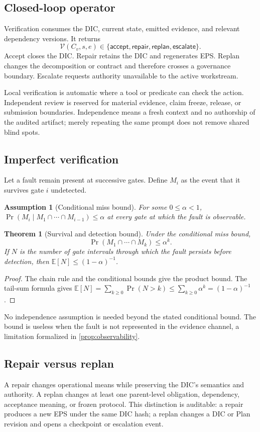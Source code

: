\documentclass[11pt]{article}
\newtheorem{assumption}[definition]{Assumption}
\newtheorem{theorem}[definition]{Theorem}
\begin{document}
\subsection{Closed-loop operator}
Verification consumes the DIC, current state, emitted evidence, and relevant dependency versions. It returns
\[
\mathcal V(C_v,s,e)\in\{\textsf{accept},\textsf{repair},\textsf{replan},\textsf{escalate}\}.
\]
\textsf{Accept} closes the DIC. \textsf{Repair} retains the DIC and regenerates EPS. \textsf{Replan} changes the decomposition or contract and therefore crosses a governance boundary. \textsf{Escalate} requests authority unavailable to the active workstream.

Local verification is automatic where a tool or predicate can check the action. Independent review is reserved for material evidence, claim freeze, release, or submission boundaries. Independence means a fresh context and no authorship of the audited artifact; merely repeating the same prompt does not remove shared blind spots.

\subsection{Imperfect verification}
Let a fault remain present at successive gates. Define $M_i$ as the event that it survives gate $i$ undetected.
\begin{assumption}[Conditional miss bound]
For some $0\le\alpha<1$,
$\Pr(M_i\mid M_1\cap\cdots\cap M_{i-1})\le\alpha$ at every gate at which the fault is observable.
\end{assumption}
\begin{theorem}[Survival and detection bound]
\label{thm:miss}
Under the conditional miss bound,
\[
\Pr(M_1\cap\cdots\cap M_k)\le\alpha^k.
\]
If $N$ is the number of gate intervals through which the fault persists before detection, then $\mathbb E[N]\le(1-\alpha)^{-1}$.
\end{theorem}
\begin{proof}
The chain rule and the conditional bounds give the product bound. The tail-sum formula gives
$\mathbb E[N]=\sum_{k\ge0}\Pr(N>k)\le\sum_{k\ge0}\alpha^k=(1-\alpha)^{-1}$.
\end{proof}
No independence assumption is needed beyond the stated conditional bound. The bound is useless when the fault is not represented in the evidence channel, a limitation formalized in \cref{prop:observability}.

\subsection{Repair versus replan}
A repair changes operational means while preserving the DIC's semantics and authority. A replan changes at least one parent-level obligation, dependency, acceptance meaning, or frozen protocol. This distinction is auditable: a repair produces a new EPS under the same DIC hash; a replan changes a DIC or Plan revision and opens a checkpoint or escalation event.
\end{document}
